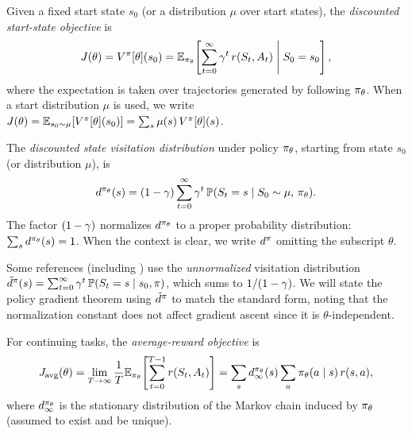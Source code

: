 \documentclass[11pt,a4paper]{article}
\begin{document}
\begin{definition}
\label{def:objective-start}
Given a fixed start state $s_0$ (or a distribution $\mu$ over start
states), the \emph{discounted start-state objective} is
\[
  J(\theta) = V^{\pi}[\theta](s_0)
  = \mathbb{E}_{\pi_\theta}\!\left[\sum_{t=0}^{\infty} \gamma^t\, r(S_t, A_t)
    \;\middle|\; S_0 = s_0\right],
\]
where the expectation is taken over trajectories generated by following
$\pi_\theta$. When a start distribution $\mu$ is used, we write
$J(\theta) = \mathbb{E}_{s_0 \sim \mu}[V^{\pi}[\theta](s_0)]
= \sum_{s} \mu(s)\, V^{\pi}[\theta](s)$.
\end{definition}

\begin{definition}
\label{def:visitation}
The \emph{discounted state visitation distribution} under policy
$\pi_\theta$, starting from state $s_0$ (or distribution $\mu$), is
\[
  d^{\pi_\theta}(s) = (1 - \gamma) \sum_{t=0}^{\infty}
  \gamma^t\, \mathbb{P}(S_t = s \mid S_0 \sim \mu,\, \pi_\theta).
\]
The factor $(1 - \gamma)$ normalizes $d^{\pi_\theta}$ to a proper
probability distribution: $\sum_s d^{\pi_\theta}(s) = 1$.
When the context is clear, we write $d^\pi$ omitting the subscript
$\theta$.
\end{definition}

\begin{remark}
\label{rem:unnormalized}
Some references (including \citet{sutton2000}) use the
\emph{unnormalized} visitation distribution
$\tilde{d}^{\pi}(s) = \sum_{t=0}^{\infty} \gamma^t\,
\mathbb{P}(S_t = s \mid s_0, \pi)$, which sums to $1/(1-\gamma)$.
We will state the policy gradient theorem using
$\tilde{d}^{\pi}$ to match the standard form, noting that the
normalization constant does not affect gradient ascent since it is
$\theta$-independent.
\end{remark}

\begin{definition}
\label{def:objective-avg}
For continuing tasks, the \emph{average-reward objective} is
\[
  J_{\mathrm{avg}}(\theta)
  = \lim_{T \to \infty} \frac{1}{T}
    \mathbb{E}_{\pi_\theta}\!\left[\sum_{t=0}^{T-1} r(S_t, A_t)\right]
  = \sum_{s} d^{\pi_\theta}_{\infty}(s) \sum_{a}
    \pi_\theta(a \mid s)\, r(s,a),
\]
where $d^{\pi_\theta}_{\infty}$ is the stationary distribution of the
Markov chain induced by $\pi_\theta$ (assumed to exist and be unique).
\end{definition}
\end{document}
